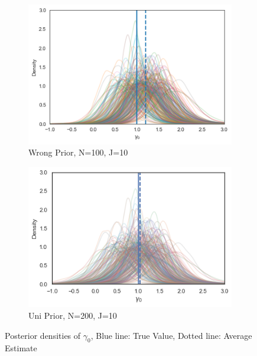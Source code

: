 \begin{figure}[H]
  \centering
  \begin{subfigure}[b]{0.4\linewidth}
    \includegraphics[width=\linewidth]{graphics/posterior_plot_gamma0_wrong}
    \caption{Wrong Prior, N=100, J=10}
  \end{subfigure}
  \begin{subfigure}[b]{0.4\linewidth}
    \includegraphics[width=\linewidth]{graphics/posterior_plot_gamma0_uni}
    \caption{Uni Prior, N=200, J=10}
  \end{subfigure}
  \caption{Posterior densities of $\gamma_0$, Blue line: True Value, Dotted line: Average Estimate}
  \label{fig:gamma0_posterior}
\end{figure}

